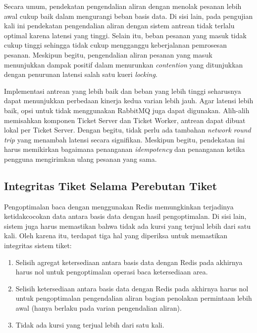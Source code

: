 Secara umum, pendekatan pengendalian aliran dengan menolak pesanan lebih awal cukup baik dalam mengurangi beban basis data. Di sisi lain, pada pengujian kali ini pendekatan pengendalian aliran dengan sistem antrean tidak terlalu optimal karena latensi yang tinggi. Selain itu, beban pesanan yang masuk tidak cukup tinggi sehingga tidak cukup mengganggu keberjalanan pemrosesan pesanan. Meskipun begitu, pengendalian aliran pesanan yang masuk menunjukkan dampak positif dalam menurunkan \textit{contention} yang ditunjukkan dengan penurunan latensi salah satu kueri \textit{locking}.

Implementasi antrean yang lebih baik dan beban yang lebih tinggi seharusnya dapat menunjukkan perbedaan kinerja kedua varian lebih jauh. Agar latensi lebih baik, opsi untuk tidak menggunakan RabbitMQ juga dapat digunakan. Alih-alih memisahkan komponen Ticket Server dan Ticket Worker, antrean dapat dibuat lokal per Ticket Server. Dengan begitu, tidak perlu ada tambahan \textit{network round trip} yang menambah latensi secara signifikan. Meskipun begitu, pendekatan ini harus memikirkan bagaimana penanganan \textit{idempotency} dan penanganan ketika pengguna mengirimkan ulang pesanan yang sama.

\pagebreak

\subsection{Integritas Tiket Selama Perebutan Tiket}

Pengoptimalan baca dengan menggunakan Redis memungkinkan terjadinya ketidakcocokan data antara basis data dengan hasil pengoptimalan. Di sisi lain, sistem juga harus memastikan bahwa tidak ada kursi yang terjual lebih dari satu kali. Oleh karena itu, terdapat tiga hal yang diperiksa untuk memastikan integritas sistem tiket:

\begin{enumerate}
    \item Selisih agregat ketersediaan antara basis data dengan Redis pada akhirnya harus nol untuk pengoptimalan operasi baca ketersediaan area.
    \item Selisih ketersediaan antara basis data dengan Redis pada akhirnya harus nol untuk pengoptimalan pengendalian aliran bagian penolakan permintaan lebih awal (hanya berlaku pada varian pengendalian aliran).
    \item Tidak ada kursi yang terjual lebih dari satu kali.
\end{enumerate}

